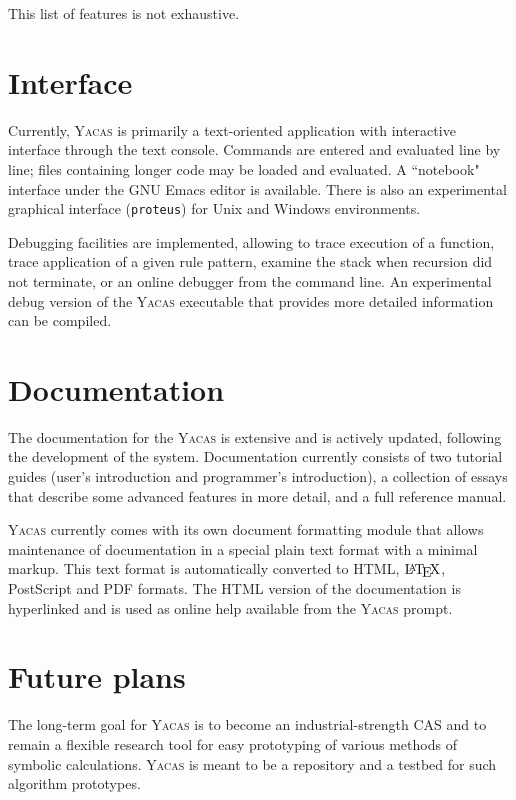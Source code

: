 \documentclass{llncs}
\begin{document}
This list of features is not exhaustive. 

\section{%
Interface}
Currently, \textsc{Yacas} is primarily a text-oriented application with interactive
interface through the text console. Commands are entered and evaluated line by
line; files containing longer code may be loaded and evaluated. A ``notebook"
interface under the GNU Emacs editor is available. There is also an experimental
graphical interface (\small{\texttt{proteus}}) for Unix and Windows environments.

Debugging facilities are implemented, allowing to trace execution of a
function, trace application of a given rule pattern, examine the stack when
recursion did not terminate, or an online debugger from the
command line. An experimental debug version of the \textsc{Yacas}
executable that provides more detailed information can be compiled.

\section{%
Documentation}
The documentation for the \textsc{Yacas} is extensive and is actively updated, following
the development of the system. Documentation currently consists of two tutorial
guides (user's introduction and programmer's introduction), a collection of
essays that describe some advanced features in more detail, and a full
reference manual.

\textsc{Yacas} currently comes with its own document formatting module that allows 
maintenance of documentation in a special plain text format with a minimal 
markup.
This text format is automatically converted to HTML, $\textrm{\LaTeX\/}$, PostScript and
PDF formats. The HTML version of the documentation is hyperlinked and is used
as online help available from the \textsc{Yacas} prompt.

\section{%
Future plans}
The long-term goal for \textsc{Yacas} is to become an industrial-strength CAS and to
remain a flexible research tool for easy prototyping of various methods of
symbolic calculations. \textsc{Yacas} is meant to be a repository and a
testbed for such algorithm prototypes.
\end{document}
